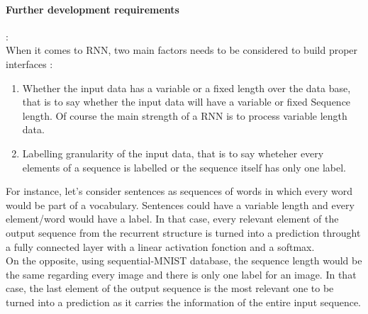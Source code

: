 \documentclass[a4paper,11pt,oneside]{article}
\begin{document}
\paragraph{Further development requirements}:\\
When it comes to RNN, two main factors needs to be considered to build proper interfaces :
\begin{enumerate}
\item Whether the input data has a variable or a fixed length over the data base, that is to say whether the input data will have a variable or fixed Sequence length. Of course the main strength of a RNN is to process variable length data.
\item Labelling granularity of the input data, that is to say wheteher every elements of a sequence is labelled or the sequence itself has only one label.
\end{enumerate}
For instance, let's consider sentences as sequences of words in which every word would be part of a vocabulary. Sentences could have a variable length and every element/word would have a label. In that case, every relevant element of the output sequence from the recurrent structure is turned into a prediction throught a fully connected layer with a linear activation fonction and a softmax.\\
On the opposite, using sequential-MNIST database, the sequence length would be the same regarding every image and there is only one label for an image. In that case, the last element of the output sequence is the most relevant one to be turned into a prediction as it carries the information of the entire input sequence.\\
\end{document}
